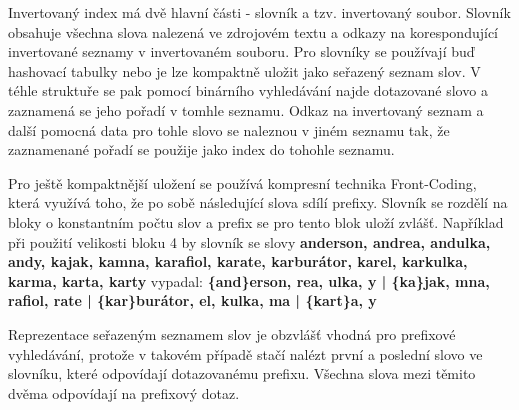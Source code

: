 \documentclass[11pt]{article}
\begin{document}
Invertovaný index má dvě hlavní části - slovník a tzv. invertovaný soubor.
Slovník obsahuje všechna slova nalezená ve zdrojovém textu a odkazy na
korespondující invertované seznamy v invertovaném souboru. Pro slovníky se
používají buď hashovací tabulky nebo je lze kompaktně uložit jako seřazený
seznam slov. V téhle struktuře se pak pomocí binárního vyhledávání najde
dotazované slovo a zaznamená se jeho pořadí v tomhle seznamu. Odkaz na
invertovaný seznam a další pomocná data pro tohle slovo se naleznou v jiném
seznamu tak, že zaznamenané pořadí se použije jako index do tohohle seznamu.

%

Pro ještě kompaktnější uložení se používá kompresní technika Front-Coding,
která využívá toho, že po sobě následující slova sdílí prefixy. Slovník se
rozdělí na bloky o konstantním počtu slov a prefix se pro tento blok uloží
zvlášť. Například při použití velikosti bloku 4 by slovník se slovy
\textbf{anderson, andrea, andulka, andy, kajak, kamna, karafiol, karate,
karburátor, karel, karkulka, karma, karta, karty} vypadal:
\textbf{\{and\}erson, rea, ulka, y | \{ka\}jak, mna, rafiol, rate | \{kar\}burátor, el, kulka, ma | \{kart\}a, y}

Reprezentace seřazeným seznamem slov je obzvlášť vhodná pro prefixové
vyhledávání, protože v takovém případě stačí nalézt první a poslední slovo ve
slovníku, které odpovídají dotazovanému prefixu. Všechna slova mezi těmito
dvěma odpovídají na prefixový dotaz.
\end{document}
